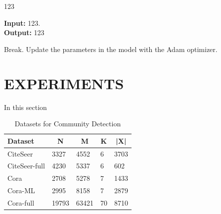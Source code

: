 \documentclass[a4paper,fleqn]{cas-dc}
\begin{document}
\begin{sloppypar}
	\begin{algorithm}[ht]
		\caption{123}
		\label{alg:1}
		\hspace*{0.02in} {\bf Input:}
		123.\\
		\hspace*{0.02in} {\bf Output:}
		123
		\begin{algorithmic}[1]
			\EndIf
			\State Break.
			\EndIf
			\State Update the parameters in the model with the Adam optimizer.
			\EndFor
			\State {}
		\end{algorithmic}
	\end{algorithm}


	\section{EXPERIMENTS}
	\label{EXPERIMENTS}
	\par{
		In this section
	}

	\begin{table}[width=.9\linewidth,cols=4,pos=ht]
		\caption{Datasets for Community Detection}
		\label{tbl1}
		\begin{tabular}{lllll}
			\hline
			\textbf{Dataset} & \multicolumn{1}{c}{\textbf{N}} & \multicolumn{1}{c}{\textbf{M}} & \multicolumn{1}{c}{\textbf{K}} & \multicolumn{1}{c}{\textbf{|X|}} \\ \hline
			CiteSeer         & 3327                           & 4552                           & 6                              & 3703                             \\
			CiteSeer-full    & 4230                           & 5337                           & 6                              & 602                              \\
			Cora             & 2708                           & 5278                           & 7                              & 1433                             \\
			Cora-ML          & 2995                           & 8158                           & 7                              & 2879                             \\
			Cora-full        & 19793                          & 63421                          & 70                             & 8710                             \\
		\end{tabular}
	\end{table}



\end{sloppypar}
\end{document}
